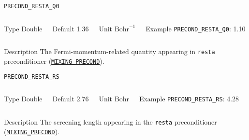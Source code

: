 \documentclass[xcolor=dvipsnames,t]{beamer}
\begin{document}
\begin{frame}[allowframebreaks]{\texttt{PRECOND\_RESTA\_Q0}} \label{PRECOND_RESTA_Q0}
\vspace*{-12pt}
\begin{columns}
\begin{block}{Type}
Double
\end{block}

\begin{block}{Default}
1.36
\end{block}

\begin{block}{Unit}
$\textrm{Bohr}^{-1}$
\end{block}

\begin{block}{Example}
\texttt{PRECOND\_RESTA\_Q0}: 1.10
\end{block}
\end{columns}

\begin{block}{Description}
The Fermi-momentum-related quantity appearing in \texttt{resta} preconditioner (\hyperlink{MIXING_PRECOND}{\texttt{MIXING\_PRECOND}}).
\end{block}

\end{frame}



\begin{frame}[allowframebreaks]{\texttt{PRECOND\_RESTA\_RS}} \label{PRECOND_RESTA_RS}
\vspace*{-12pt}
\begin{columns}
\begin{block}{Type}
Double
\end{block}

\begin{block}{Default}
2.76
\end{block}

\begin{block}{Unit}
Bohr
\end{block}

\begin{block}{Example}
\texttt{PRECOND\_RESTA\_RS}: 4.28
\end{block}
\end{columns}

\begin{block}{Description}
The screening length appearing in the \texttt{resta} preconditioner (\hyperlink{MIXING_PRECOND}{\texttt{MIXING\_PRECOND}}). 
\end{block}

\end{frame}
\end{document}
